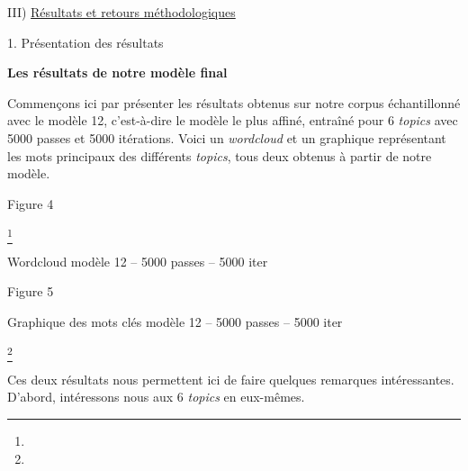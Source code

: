 \documentclass[letterpaper,portrait,12pt]{article}
\begin{document}
III) \uline{R\'{e}sultats et retours m\'{e}thodologiques}











1. Pr\'{e}sentation des r\'{e}sultats








	\textbf{Les r\'{e}sultats de notre mod\`{e}le final}





\textbf{\textcolor[rgb]{0.000,0.000,0.000}{	}}\textcolor[rgb]{0.000,0.000,0.000}{Commen\c{c}ons ici par pr\'{e}senter les r\'{e}sultats obtenus sur notre corpus \'{e}chantillonn\'{e} avec le mod\`{e}le 12, c'est-\`{a}-dire le mod\`{e}le le plus affin\'{e}, entra\^{i}n\'{e} pour 6 }\emph{\textcolor[rgb]{0.000,0.000,0.000}{topics}}\textcolor[rgb]{0.000,0.000,0.000}{ avec 5000 passes et 5000 it\'{e}rations. Voici un }\emph{\textcolor[rgb]{0.000,0.000,0.000}{wordcloud}}\textcolor[rgb]{0.000,0.000,0.000}{ et un graphique repr\'{e}sentant les mots principaux des diff\'{e}rents }\emph{\textcolor[rgb]{0.000,0.000,0.000}{topics}}\textcolor[rgb]{0.000,0.000,0.000}{, tous deux obtenus \`{a} partir de notre mod\`{e}le.}





\textcolor[rgb]{0.000,0.000,0.000}{Figure 4}


\footnote{} 


\textcolor[rgb]{0.000,0.000,0.000}{Wordcloud mod\`{e}le 12 -- 5000 passes -- 5000 iter}








Figure 5





Graphique des mots cl\'{e}s mod\`{e}le 12 -- 5000 passes -- 5000 iter





\footnote{} 











\textcolor[rgb]{0.000,0.000,0.000}{	Ces deux r\'{e}sultats nous permettent ici de faire quelques remarques int\'{e}ressantes. D'abord, int\'{e}ressons nous aux 6 }\emph{\textcolor[rgb]{0.000,0.000,0.000}{topics}}\textcolor[rgb]{0.000,0.000,0.000}{ en eux-m\^{e}mes. }
\end{document}
